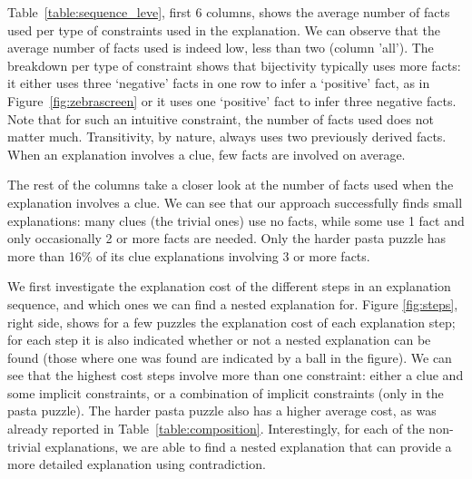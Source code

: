 Table~\ref{table:sequence_leve}, first 6 columns, shows the average number of facts used per type of constraints used in the explanation.
We can observe that the average number of facts used is indeed low, less than two (column 'all').
The breakdown per type of constraint shows that bijectivity typically uses more facts: it either uses three `negative' facts in one row to infer a `positive' fact, as in Figure~\ref{fig:zebrascreen} or it uses one `positive' fact to infer three negative facts.
Note that for such an intuitive constraint, the number of facts used does not matter much. Transitivity, by nature, always uses two previously derived facts.
When an explanation involves a clue, few facts are involved on average. 

The rest of the columns take a closer look at the number of facts used when the explanation involves a clue. We can see that our approach successfully finds small explanations: many clues (the trivial ones) use no facts, while some use 1 fact and only occasionally 2 or more facts are needed. Only the harder pasta puzzle has more than 16\% of its clue explanations involving 3 or more facts.

We first investigate the explanation cost of the different steps in an explanation sequence, and which ones we can find a nested explanation for. Figure \ref{fig:steps}, right side, shows for a few puzzles the explanation cost of each explanation step; for each step it is also indicated whether or not a nested explanation can be found (those where one was found are indicated by a ball in the figure). We can see that the highest cost steps involve more than one constraint: either a clue and some implicit constraints, or a combination of implicit constraints (only in the pasta puzzle). The harder pasta puzzle also has a higher average cost, as was already reported in Table~\ref{table:composition}. Interestingly, for each of the non-trivial explanations, we are able to find a nested explanation that can provide a more detailed explanation using contradiction. 


